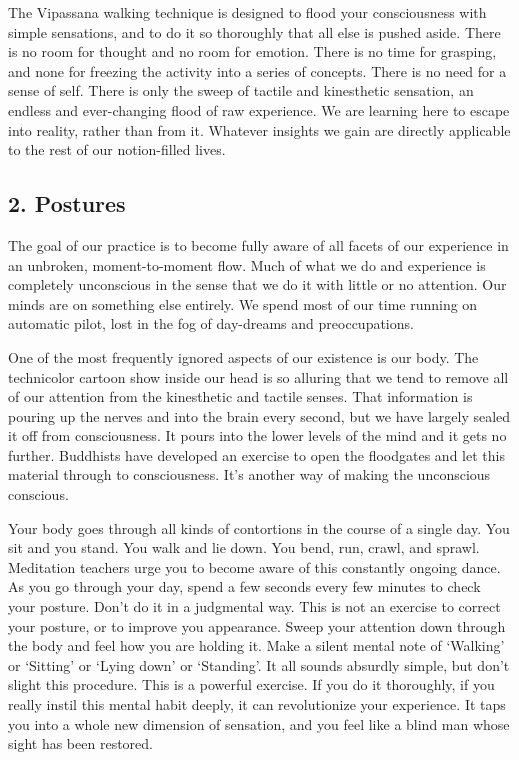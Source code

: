 The Vipassana walking technique is designed to flood your consciousness with
simple sensations, and to do it so thoroughly that all else is pushed aside.
There is no room for thought and no room for emotion. There is no time for
grasping, and none for freezing the activity into a series of concepts. There is
no need for a sense of self. There is only the sweep of tactile and kinesthetic
sensation, an endless and ever-changing flood of raw experience. We are learning
here to escape into reality, rather than from it.  Whatever insights we gain are
directly applicable to the rest of our notion-filled lives.

\subsection*{2. Postures}

The goal of our practice is to become fully aware of all facets of our
experience in an unbroken, moment-to-moment flow. Much of what we do and
experience is completely unconscious in the sense that we do it with little or
no attention. Our minds are on something else entirely. We spend most of our
time running on automatic pilot, lost in the fog of day-dreams and
preoccupations.

One of the most frequently ignored aspects of our existence is our body. The
technicolor cartoon show inside our head is so alluring that we tend to remove
all of our attention from the kinesthetic and tactile senses. That information
is pouring up the nerves and into the brain every second, but we have largely
sealed it off from consciousness. It pours into the lower levels of the mind and
it gets no further. Buddhists have developed an exercise to open the floodgates
and let this material through to consciousness. It's another way of making the
unconscious conscious.

Your body goes through all kinds of contortions in the course of a single day.
You sit and you stand. You walk and lie down.  You bend, run, crawl, and sprawl.
Meditation teachers urge you to become aware of this constantly ongoing dance.
As you go through your day, spend a few seconds every few minutes to check your
posture. Don't do it in a judgmental way. This is not an exercise to correct
your posture, or to improve you appearance. Sweep your attention down through
the body and feel how you are holding it. Make a silent mental note of `Walking'
or `Sitting' or `Lying down' or `Standing'. It all sounds absurdly simple, but
don't slight this procedure. This is a powerful exercise. If you do it
thoroughly, if you really instil this mental habit deeply, it can revolutionize
your experience. It taps you into a whole new dimension of sensation, and you
feel like a blind man whose sight has been restored.


